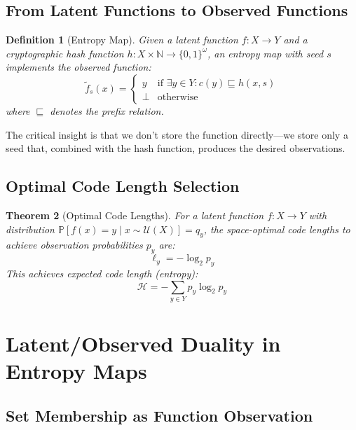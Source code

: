 \documentclass[11pt,final,hidelinks]{article}
\newtheorem{theorem}{Theorem}[section]
\newtheorem{definition}[theorem]{Definition}
\newcommand{\obs}[1]{\widetilde{#1}}  %
\newcommand{\ProbCond}[2]{\mathbb{P}\left[#1 \mid #2\right]}
\begin{document}
\subsection{From Latent Functions to Observed Functions}

\begin{definition}[Entropy Map]
Given a latent function $f: X \to Y$ and a cryptographic hash function $h: X \times \mathbb{N} \to \{0,1\}^\omega$, an entropy map with seed $s$ implements the observed function:
\begin{equation}
\obs{f}_s(x) = \begin{cases}
y & \text{if } \exists y \in Y: c(y) \sqsubseteq h(x, s) \\
\bot & \text{otherwise}
\end{cases}
\end{equation}
where $\sqsubseteq$ denotes the prefix relation.
\end{definition}

The critical insight is that we don't store the function directly—we store only a seed that, combined with the hash function, produces the desired observations.

\subsection{Optimal Code Length Selection}

\begin{theorem}[Optimal Code Lengths]
For a latent function $f: X \to Y$ with distribution $\ProbCond{f(x) = y}{x \sim \mathcal{U}(X)} = q_y$, the space-optimal code lengths to achieve observation probabilities $p_y$ are:
\begin{equation}
\ell_y = -\log_2 p_y
\end{equation}
This achieves expected code length (entropy):
\begin{equation}
\mathcal{H} = -\sum_{y \in Y} p_y \log_2 p_y
\end{equation}
\end{theorem}

\section{Latent/Observed Duality in Entropy Maps}

\subsection{Set Membership as Function Observation}
\end{document}
